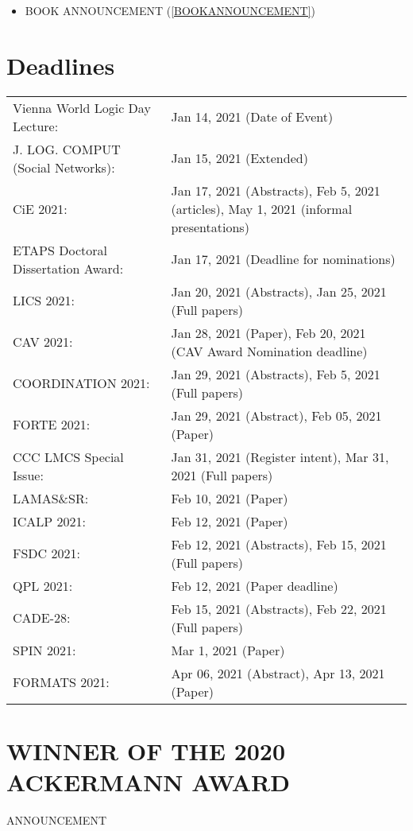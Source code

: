 \documentclass{article}
\begin{document}
\begin{itemize}
\begin{itemize}\item BOOK ANNOUNCEMENT (\cref{BOOKANNOUNCEMENT})
\end{itemize} 
\end{itemize}\section{Deadlines}\label{deadlines}\begin{tabulary}{\linewidth}{LL}Vienna World Logic Day Lecture:  & Jan 14, 2021 (Date of Event) \\
J. LOG. COMPUT (Social Networks):  & Jan 15, 2021 (Extended) \\
CiE 2021:  & Jan 17, 2021 (Abstracts), Feb 5, 2021 (articles), May 1, 2021 (informal presentations) \\
ETAPS Doctoral Dissertation Award:  & Jan 17, 2021 (Deadline for nominations) \\
LICS 2021:  & Jan 20, 2021 (Abstracts), Jan 25, 2021 (Full papers) \\
CAV 2021:  & Jan 28, 2021 (Paper), Feb 20, 2021 (CAV Award Nomination deadline) \\
COORDINATION 2021:  & Jan 29, 2021 (Abstracts), Feb 5, 2021 (Full papers) \\
FORTE 2021:  & Jan 29, 2021 (Abstract), Feb 05, 2021 (Paper) \\
CCC LMCS Special Issue:  & Jan 31, 2021 (Register intent), Mar 31, 2021 (Full papers) \\
LAMAS\&SR:  & Feb 10, 2021 (Paper) \\
ICALP 2021:  & Feb 12, 2021 (Paper) \\
FSDC 2021:  & Feb 12, 2021 (Abstracts), Feb 15, 2021 (Full papers) \\
QPL 2021:  & Feb 12, 2021 (Paper  deadline) \\
CADE-28:  & Feb 15, 2021 (Abstracts), Feb 22, 2021 (Full papers) \\
SPIN 2021:  & Mar 1, 2021 (Paper) \\
FORMATS 2021:  & Apr 06, 2021 (Abstract), Apr 13, 2021 (Paper) \\
\end{tabulary}
\section{WINNER OF THE 2020 ACKERMANN AWARD}\label{WINNEROFTHE2020ACKERMANNAWARD}ANNOUNCEMENT 
\end{document}
